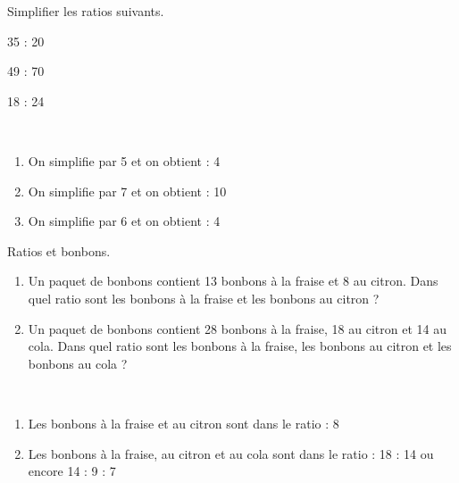 \begin{colonne*exercice}


\begin{exercice} %
   Simplifier les ratios suivants.
   \begin{colenumerate}{3}
      \item 35 : 20
      \item 49 : 70
      \item18 : 24
   \end{colenumerate}
\end{exercice}

\begin{corrige}
   \ \\ [-5mm]
   \begin{enumerate}
      \item On simplifie par 5 et on obtient { : 4}
      \item On simplifie par 7 et on obtient { : 10}
      \item On simplifie par 6 et on obtient { : 4}
   \end{enumerate}
\end{corrige}

\bigskip


\begin{exercice} %
   Ratios et bonbons.
   \begin{enumerate}
      \item Un paquet de bonbons contient 13 bonbons à la fraise et 8 au citron. Dans quel ratio sont les bonbons à la fraise et les bonbons au citron ?
      \item Un paquet de bonbons contient 28 bonbons à la fraise, 18 au citron et 14 au cola. Dans quel ratio sont les bonbons à la fraise, les bonbons au citron et les bonbons au cola ?
   \end{enumerate}
\end{exercice}

\begin{corrige}
   \ \\ [-5mm]
   \begin{enumerate}
      \item Les bonbons à la fraise et au citron sont dans le ratio { : 8}
      \item Les bonbons à la fraise, au citron et au cola sont dans le ratio { : 18 : 14} ou encore 14 : 9 : 7
   \end{enumerate}
\end{corrige}

\bigskip



\end{colonne*exercice}
